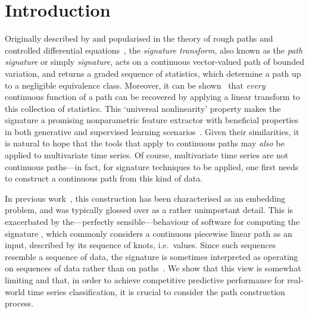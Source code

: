 \documentclass{article}
\begin{document}


\section{Introduction}

Originally described by \citet{Chen54, Chen57, Chen58} and popularised
in the theory of rough paths and controlled differential
equations~\cite{lyons1998differential, FritzVictoir10, lyons2014rough},
the \emph{signature transform}, also known as the \emph{path signature}
or simply \emph{signature}, acts on a continuous vector-valued path of
bounded variation, and returns a graded sequence of statistics, which
determine a path up to a negligible equivalence class. Moreover,
it can be shown~\cite[Proposition A.6]{kidger2019deep} that \emph{every}
continuous function of a path can be recovered by applying a linear
transform to this collection of statistics. This `universal
nonlinearity' property makes the signature a promising nonparametric
feature extractor with beneficial properties in both generative and
supervised learning scenarios~\citep{kidger2019deep}.
%
Given their similarities, it is natural to hope that the tools that
apply to continuous paths may \emph{also} be applied to multivariate
time series. Of course, multivariate time series are not continuous
paths---in fact, for signature techniques to be applied, one first needs
to construct a continuous path from this kind of data.

In previous work~\cite{kidger2019deep, levin2013, fermanian2019embedding}, this
construction has been characterised as an embedding problem, and was
typically glossed over as a rather unimportant detail.
%
This is exacerbated by the---perfectly sensible---behaviour of software
for computing the signature \cite{iisignature, signatory}, which
commonly considers a continuous piecewise linear path as an input,
described by its sequence of knots, i.e.\ values.
%
Since such sequences resemble a sequence of data, the signature is
sometimes interpreted as operating on sequences of data rather than on
paths~\cite{kidger2019deep, levin2013}.
%
We show that this view is somewhat limiting and that, in order to
achieve competitive predictive performance for real-world time series
classification, it is crucial to consider the path construction process.
\end{document}
